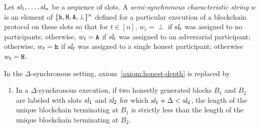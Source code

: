   \begin{definition}\label{def:semisync-char-string}
    Let $\textsl{sl}_1, \ldots, \textsl{sl}_{n}$ be a sequence of slots. 
    A \emph{semi-synchronous characteristic string} $w$ 
    is an element of $\{\mathtt{h},\mathtt{H},\mathtt{A}, \perp\}^n$ 
    defined for a particular execution of a blockchain protocol 
    on these slots so that 
    for $t \in [n]$, 
    $w_t = \perp$ if $\textsl{sl}_{t}$ was assigned to no participants; otherwise, 
    $w_t = \mathtt{A}$ if $\textsl{sl}_{t}$ was assigned to an adversarial participant; otherwise, 
    $w_t = \mathtt{h}$ if $\textsl{sl}_{t}$ was assigned to a single honest participant; otherwise 
    $w_t = \mathtt{H}$.
  \end{definition}


  In the $\Delta$-synchronous setting, axiom~\ref{axiom:honest-depth} 
  is replaced by 
  \begin{enumerate}[label={\textbf{A\arabic*}\textsubscript{$\Delta$}}., ref={\textbf{A\arabic*}\textsubscript{$\Delta$}}, start=4]
  \item\label{axiom:honest-depth-delta} 
    In a $\Delta$-synchronous execution, 
    if two honestly generated blocks $B_1$ and $B_2$ are labeled
    with slots $\textsl{sl}_1$ and $\textsl{sl}_2$ for which $\textsl{sl}_1 + \Delta < \textsl{sl}_2$,
    the length of the unique blockchain terminating at $B_1$ is
    strictly less than the length of the unique blockchain terminating at $B_2$.
  \end{enumerate}

